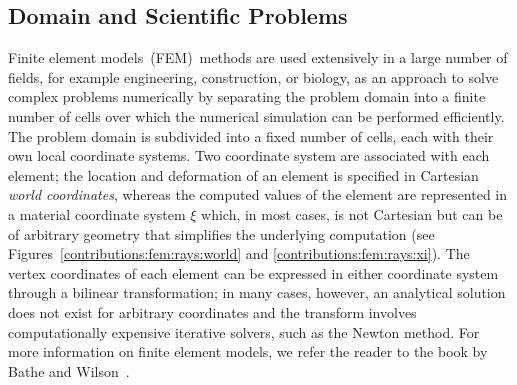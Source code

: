 \subsection{Domain and Scientific Problems} \label{contributions:fem:background}
Finite element models~(FEM)~methods are used extensively in a large number of fields, for example engineering, construction, or biology, as an approach to solve complex problems numerically by separating the problem domain into a finite number of cells over which the numerical simulation can be performed efficiently.  The problem domain is subdivided into a fixed number of cells, each with their own local coordinate systems.  Two coordinate system are associated with each element; the location and deformation of an element is specified in Cartesian \emph{world coordinates}, whereas the computed values of the element are represented in a material coordinate system $\xi$ which, in most cases, is not Cartesian but can be of arbitrary geometry that simplifies the underlying computation (see Figures~\ref{contributions:fem:rays:world} and \ref{contributions:fem:rays:xi}).  The vertex coordinates of each element can be expressed in either coordinate system through a bilinear transformation; in many cases, however, an analytical solution does not exist for arbitrary coordinates and the transform involves computationally expensive iterative solvers, such as the Newton method.  For more information on finite element models, we refer the reader to the book by Bathe and Wilson~\cite{bathe1976numerical}.

